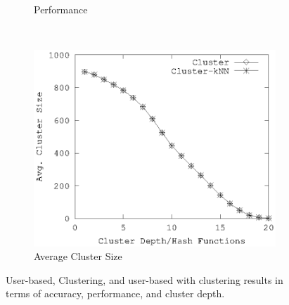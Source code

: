 \documentclass[conference]{IEEEtran}
\begin{document}
\begin{figure}[!h]
\begin{subfigure}[b]{0.225\textwidth}
                \caption{Performance}
                \label{fig:cl-runtime}
        \end{subfigure} 
        \\
         \begin{subfigure}[b]{0.225\textwidth}
                \includegraphics[width=\textwidth]{charts/cl-size.eps}
                \caption{Average Cluster Size}
                \label{fig:lsh-functions-candidate-size}
        \end{subfigure} 
        \caption{User-based, Clustering, and user-based with clustering results in terms of accuracy, performance, and cluster depth.}
        \label{fig:custering}
\end{figure}
\end{document}
